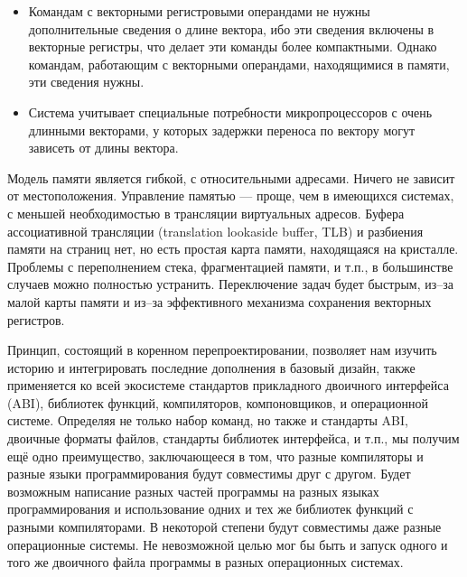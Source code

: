 \documentclass[forwardcom.tex]{subfiles}
\begin{document}
\begin{itemize}
\item Командам с векторными регистровыми операндами не нужны дополнительные сведения о длине вектора, ибо эти сведения включены в векторные регистры, что делает эти команды более компактными. Однако командам, работающим с векторными операндами, находящимися в памяти, эти сведения нужны.

\item Система учитывает специальные потребности микропроцессоров с очень длинными векторами, у которых задержки переноса по вектору могут зависеть от длины вектора.
\end{itemize}

Модель памяти является гибкой, с относительными адресами. Ничего не зависит от местоположения. Управление памятью --- проще, чем в имеющихся системах, с меньшей необходимостью в трансляции виртуальных адресов. Буфера ассоциативной трансляции (translation lookaside buffer, TLB) и разбиения памяти на страниц нет, но есть простая карта памяти, находящаяся на кристалле. Проблемы с переполнением стека, фрагментацией памяти, и т.п., в большинстве случаев можно полностью устранить. Переключение задач будет быстрым, из--за малой карты памяти и из--за эффективного механизма сохранения векторных регистров.

Принцип, состоящий в коренном перепроектировании, позволяет нам изучить историю и интегрировать последние дополнения в базовый дизайн, также применяется ко всей экосистеме стандартов прикладного двоичного интерфейса (ABI), библиотек функций, компиляторов, компоновщиков, и операционной системе. Определяя не только набор команд, но также и стандарты ABI, двоичные форматы файлов, стандарты библиотек интерфейса, и т.п., мы получим ещё одно преимущество, заключающееся в том, что разные компиляторы и  разные языки программирования будут совместимы друг с другом. Будет возможным написание разных частей программы на разных языках программирования и использование одних и тех же библиотек функций с разными компиляторами. В некоторой степени будут совместимы даже разные операционные системы. Не невозможной целью мог бы быть и запуск одного и того же двоичного файла программы в разных операционных системах.
\end{document}
